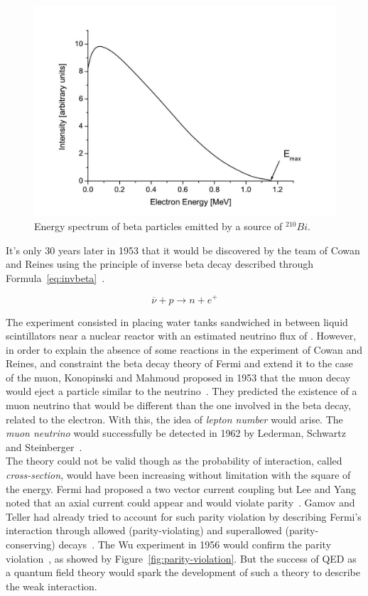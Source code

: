 	\begin{figure}[H]
		\centering
		\includegraphics[width=\plotwidth]{fig/chapt2/Beta-decay-electron-spectrum.jpg}
		\caption{\label{fig:beta-decay} Energy spectrum of beta particles emitted by a source of $^{210}Bi$.}
	\end{figure}
	
	It's only 30 years later in 1953 that it would be discovered by the team of Cowan and Reines using the principle of inverse beta decay described through Formula~\ref{eq:invbeta}~\cite{COWAN1953}.
	
	\begin{equation}
		\label{eq:invbeta}
		\overline{\nu} + p \rightarrow n + e^+
	\end{equation}
	
	The experiment consisted in placing water tanks sandwiched in between liquid scintillators near a nuclear reactor with an estimated neutrino flux of \siflux. However, in order to explain the absence of some reactions in the experiment of Cowan and Reines, and constraint the beta decay theory of Fermi and extend it to the case of the muon, Konopinski and Mahmoud proposed in 1953 that the muon decay would eject a particle similar to the neutrino~\cite{KONOPINSKI1953}. They predicted the existence of a muon neutrino that would be different than the one involved in the beta decay, related to the electron. With this, the idea of \textit{lepton number} would arise. The \textit{muon neutrino} would successfully be detected in 1962 by Lederman, Schwartz and Steinberger~\cite{LEDERMAN1962}.\\
	
	The theory could not be valid though as the probability of interaction, called \textit{cross-section}, would have been increasing without limitation with the square of the energy. Fermi had proposed a two vector current coupling but Lee and Yang noted that an axial current could appear and would violate parity~\cite{LEE1956}. Gamov and Teller had already tried to account for such parity violation by describing Fermi's interaction through allowed (parity-violating) and superallowed (parity-conserving) decays~\cite{GAMOW1936}. The Wu experiment in 1956 would confirm the parity violation~\cite{WU1957}, as showed by Figure~\ref{fig:parity-violation}. But the success of QED as a quantum field theory would spark the development of such a theory to describe the weak interaction.
	
